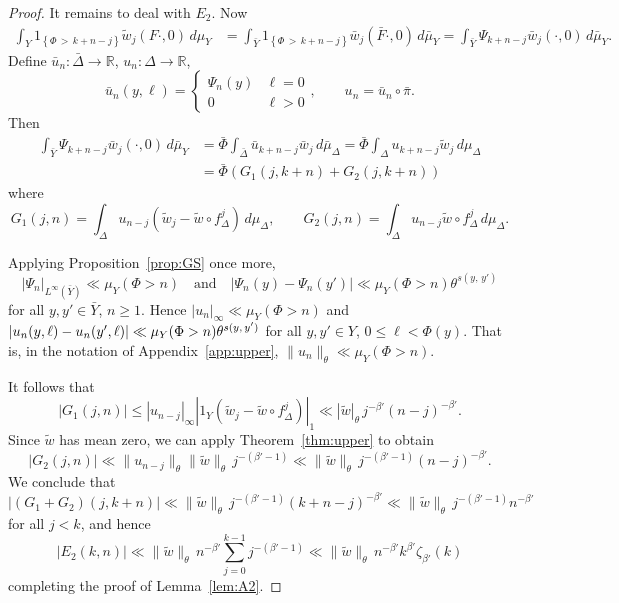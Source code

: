 \documentclass[AHL,Unicode,longabstracts,published]{cedram}
\newcommand{\R}{\mathbb{R}}
\newcommand{\tw}{\widetilde{w}}
\newcommand{\bY}{\bar{Y}}
\newcommand{\bDelta}{\bar{\Delta}}
\newcommand{\bPhi}{\bar{\Phi}}
\newcommand{\bF}{\bar{F}}
\begin{document}
\begin{proof}
It remains to deal with $E_2$. Now
\begin{align*}
\int_Y1_{\left\{\Phi\,>\,k+n-j\right\}}\tw_j(F\cdot,0) \,d\mu_Y & =
\int_{\bY} 1_{\left\{\Phi\,>\,k+n-j\right\}}\bar{w}_j(\bF\cdot,0) \,d\bar\mu_Y =\int_{\bY} \Psi_{k+n-j} \bar w_j(\cdot,0) \,d\bar\mu_Y.
\end{align*}
Define $\bar u_n:\bDelta\to\R$, $u_n:\Delta\to\R$,
\[
\bar u_n(y,\ell)=
\begin{cases}
\Psi_n(y) & \ell=0
\\ 0 & \ell>0
\end{cases}, \qquad u_n=\bar u_n\circ\bar\pi.
\]
Then
\begin{align*}
\int_{\bY} \Psi_{k+n-j}\bar w_j(\cdot,0) \,d\bar\mu_Y & =
\bPhi\int_{\bDelta} \bar u_{k+n-j} \bar w_j \,d\bar\mu_\Delta =
\bPhi\int_\Delta u_{k+n-j} \tw_j \,d\mu_\Delta
\\ & =\bPhi\left(G_1(j,k+n)+G_2(j,k+n)\right)
\end{align*}
where
\[
G_1(j,n)=\int_\Delta u_{n-j} \left(\tw_j-\tw\circ f_\Delta^j\right) \,d\mu_\Delta, \qquad G_2(j,n)=\int_\Delta u_{n-j} \tw\circ f_\Delta^j \,d\mu_\Delta.
\]

Applying Proposition~\ref{prop:GS} once more,
\[
\left|\Psi_n\right|_{L^\infty(\bY)} \ll \mu_Y(\Phi>n)
\quad\text{and}\quad \left|\Psi_n(y)- \Psi_n(y')\right| \ll \mu_Y(\Phi>n) \theta^{s(y,\,y')}
\]
for all $y,y'\in \bY$, $n\ge1$. Hence $|u_n|_\infty \ll \mu_Y(\Phi>n)$ and $|u_n(y,\ell)-u_n(y',\ell)|\linebreak\ll \mu_Y(\Phi>n) \theta^{s(y,\,y')}$ for all $y,y'\in Y$, $0\le \ell<\Phi(y)$. That is, in the notation of Appendix~\ref{app:upper}, $\|u_n\|_\theta\ll \mu_Y(\Phi>n)$.

It follows that
\[
|G_1(j,n)|\le |u_{n-j}|_\infty|1_Y\left(\tw_j-\tw\circ f_\Delta^j\right)|_1
\ll |\tw|_\theta\,j^{-\beta'}(n-j)^{-\beta'}.
\]
Since $\tw$ has mean zero, we can apply Theorem~\ref{thm:upper} to obtain
\[
\left|G_2(j,n)\right| \ll \|u_{n-j}\|_\theta \|\tw\|_\theta\, j^{-(\beta'-1)}
\ll \|\tw\|_\theta\,j^{-(\beta'-1)}(n-j)^{-\beta'}.
\]
We conclude that
\[
\left|(G_1+G_2)(j,k+n)\right|
\ll \|\tw\|_\theta\, j^{-(\beta'-1)}(k+n-j)^{-\beta'}
\ll \|\tw\|_\theta\, j^{-(\beta'-1)}n^{-\beta'}
\]
for all $j<k$, and hence
\[
\left|E_2(k,n)\right|\ll \|\tw\|_\theta\,n^{-\beta'}\sum_{j=0}^{k-1}j^{-(\beta'-1)}
\ll \|\tw\|_\theta \, n^{-\beta'}k^{\beta'}\zeta_{\beta'}(k)
\]
completing the proof of Lemma~\ref{lem:A2}.
\end{proof}
\end{document}
